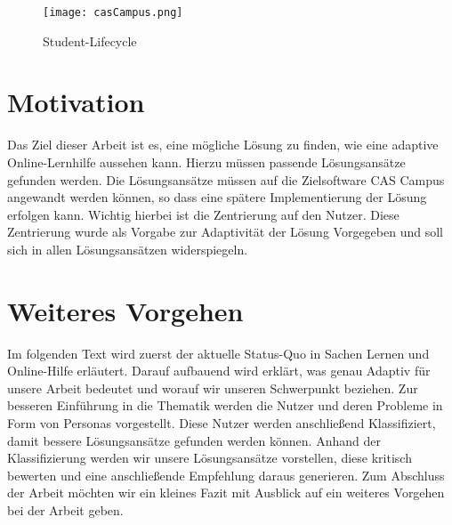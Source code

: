 \begin{figure}[ht]
\begin{center}
\texttt{[image: casCampus.png]}
\caption{Student-Lifecycle}
\label{img1:stdLife}
\end{center}
\end{figure} 

\section{Motivation}
Das Ziel dieser Arbeit ist es, eine mögliche Lösung zu finden, wie eine adaptive Online-Lernhilfe aussehen kann. Hierzu müssen passende Lösungsansätze gefunden werden. Die Lösungsansätze müssen auf die Zielsoftware CAS Campus angewandt werden können, so dass eine spätere Implementierung der Lösung erfolgen kann.  Wichtig hierbei ist die Zentrierung auf den Nutzer. Diese Zentrierung wurde als Vorgabe zur Adaptivität der Lösung Vorgegeben und soll sich in allen Lösungsansätzen widerspiegeln.  

\section{Weiteres Vorgehen}
Im folgenden Text wird zuerst der aktuelle Status-Quo in Sachen Lernen und Online-Hilfe erläutert. Darauf aufbauend wird erklärt, was genau Adaptiv für unsere Arbeit bedeutet und worauf wir unseren Schwerpunkt beziehen. Zur besseren Einführung in die Thematik werden die Nutzer und deren Probleme in Form von Personas vorgestellt. Diese Nutzer werden anschließend Klassifiziert, damit bessere Lösungsansätze gefunden werden können. Anhand der Klassifizierung werden wir unsere Lösungsansätze vorstellen, diese kritisch bewerten und eine anschließende Empfehlung daraus generieren. Zum Abschluss der Arbeit möchten wir ein kleines Fazit mit Ausblick auf ein weiteres Vorgehen bei der Arbeit geben.


